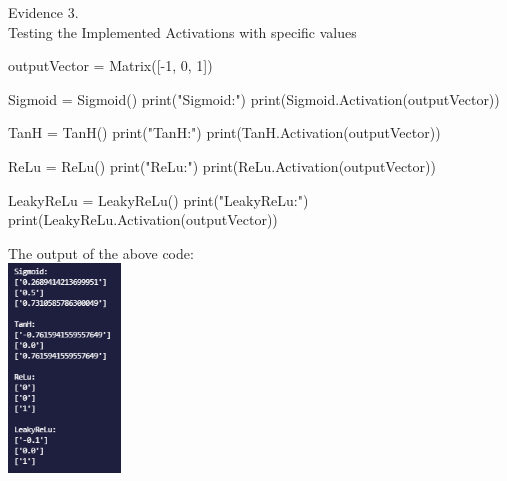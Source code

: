 \begin{center}
    {\large Evidence 3.\rn } \\ 
    \vspace{0.3cm}
    Testing the Implemented Activations with specific values \\
    
    \begin{pythoncode}
outputVector = Matrix([-1, 0, 1])

Sigmoid = Sigmoid()
print("Sigmoid:")
print(Sigmoid.Activation(outputVector))

TanH = TanH()
print("TanH:")
print(TanH.Activation(outputVector))

ReLu = ReLu()
print("ReLu:")
print(ReLu.Activation(outputVector)) 

LeakyReLu = LeakyReLu()
print("LeakyReLu:")
print(LeakyReLu.Activation(outputVector))
    \end{pythoncode}

    The output of the above code: \\
    \includegraphics[width=3cm]{Images/Testing/T3.All.PNG} \\


\end{center}
